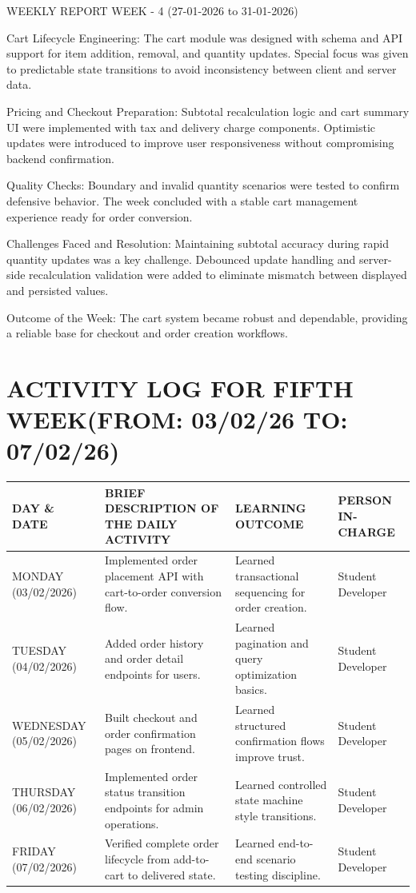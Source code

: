\documentclass[12pt,a4paper]{report}
\begin{document}
WEEKLY REPORT
WEEK - 4 (27-01-2026 to 31-01-2026)

Cart Lifecycle Engineering:
The cart module was designed with schema and API support for item addition, removal, and quantity updates. Special focus was given to predictable state transitions to avoid inconsistency between client and server data.

Pricing and Checkout Preparation:
Subtotal recalculation logic and cart summary UI were implemented with tax and delivery charge components. Optimistic updates were introduced to improve user responsiveness without compromising backend confirmation.

Quality Checks:
Boundary and invalid quantity scenarios were tested to confirm defensive behavior. The week concluded with a stable cart management experience ready for order conversion.

Challenges Faced and Resolution:
Maintaining subtotal accuracy during rapid quantity updates was a key challenge. Debounced update handling and server-side recalculation validation were added to eliminate mismatch between displayed and persisted values.

Outcome of the Week:
The cart system became robust and dependable, providing a reliable base for checkout and order creation workflows.

\section*{ACTIVITY LOG FOR FIFTH WEEK(FROM: 03/02/26 TO: 07/02/26)}
\begin{longtable}{|p{2.2cm}|p{5.2cm}|p{4.3cm}|p{3.2cm}|}
\hline
\textbf{DAY \& DATE} & \textbf{BRIEF DESCRIPTION OF THE DAILY ACTIVITY} & \textbf{LEARNING OUTCOME} & \textbf{PERSON IN- CHARGE} \\
\hline
MONDAY (03/02/2026) & Implemented order placement API with cart-to-order conversion flow. & Learned transactional sequencing for order creation. & Student Developer \\
\hline
TUESDAY (04/02/2026) & Added order history and order detail endpoints for users. & Learned pagination and query optimization basics. & Student Developer \\
\hline
WEDNESDAY (05/02/2026) & Built checkout and order confirmation pages on frontend. & Learned structured confirmation flows improve trust. & Student Developer \\
\hline
THURSDAY (06/02/2026) & Implemented order status transition endpoints for admin operations. & Learned controlled state machine style transitions. & Student Developer \\
\hline
FRIDAY (07/02/2026) & Verified complete order lifecycle from add-to-cart to delivered state. & Learned end-to-end scenario testing discipline. & Student Developer \\
\hline
\end{longtable}
\end{document}

